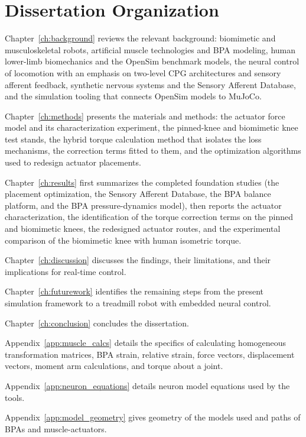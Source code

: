\section{Dissertation Organization}\label{sec:organization}

Chapter~\ref{ch:background} reviews the relevant background: biomimetic and musculoskeletal robots, artificial muscle technologies and BPA modeling, human lower-limb biomechanics and the OpenSim benchmark models, the neural control of locomotion with an emphasis on two-level CPG architectures and sensory afferent feedback, synthetic nervous systems and the Sensory Afferent Database, and the simulation tooling that connects OpenSim models to MuJoCo. 

Chapter~\ref{ch:methods} presents the materials and methods: the actuator force model and its characterization experiment, the pinned-knee and biomimetic knee test stands, the hybrid torque calculation method that isolates the loss mechanisms, the correction terms fitted to them, and the optimization algorithms used to redesign actuator placements. 

Chapter~\ref{ch:results} first summarizes the completed foundation studies (the placement optimization, the Sensory Afferent Database, the BPA balance platform, and the BPA pressure-dynamics model), then reports the actuator characterization, the identification of the torque correction terms on the pinned and biomimetic knees, the redesigned actuator routes, and the experimental comparison of the biomimetic knee with human isometric torque.


Chapter~\ref{ch:discussion} discusses the findings, their limitations, and their implications for real-time control.


Chapter~\ref{ch:futurework} identifies the remaining steps from the present simulation framework to a treadmill robot with embedded neural control.


Chapter~\ref{ch:conclusion} concludes the dissertation.

Appendix~\ref{app:muscle_calcs} details the specifics of calculating homogeneous transformation matrices, BPA strain, relative strain, force vectors, displacement vectors, moment arm calculations, and torque about a joint.

Appendix~\ref{app:neuron_equations} details neuron model equations used by the tools.

Appendix~\ref{app:model_geometry} gives geometry of the models used and paths of BPAs and muscle-actuators.
